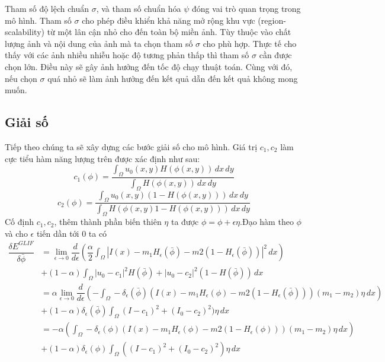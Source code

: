 \documentclass[14pt,oneside,a4paper]{extreport}
\begin{document}
Tham số độ lệch chuẩn $\sigma$, và tham số chuẩn hóa $\psi$ đóng vai trò quan trọng trong mô hình.  Tham số $\sigma$ cho phép điều khiển khả năng mở rộng khu vực (region-scalability) từ một lân cận nhỏ cho đến toàn bộ miền ảnh. Tùy thuộc vào chất lượng ảnh và nội dung của ảnh mà ta chọn tham số $\sigma$ cho phù hợp. Thực tế cho thấy với các ảnh nhiều nhiễu hoặc độ tương phản thấp thì tham số $\sigma$ cần được chọn lớn. Điều này sẽ gây  ảnh hưởng đến tốc độ chạy thuật toán. Cùng với đó, nếu chọn $\sigma$ quá nhỏ sẽ làm ảnh hưởng đến kết quả dẫn đến kết quả không mong muốn.
\subsection{Giải số}
Tiếp theo chúng ta sẽ xây dựng các bước giải số cho mô hình. Giá trị $c_1, c_2$ làm cực tiểu hàm năng lượng trên được xác định như sau:
\begin{equation*}
c_1(\phi)=\dfrac{\int_{\Omega}u_0(x,y)H(\phi(x,y))\,dx \,dy}{\int_{\Omega}H(\phi(x,y))\,dx\,dy}
\end{equation*}
\begin{equation*}
c_2(\phi)=\dfrac{\int_{\Omega}u_0(x,y)(1-H(\phi(x,y)))\,dx \,dy}{\int_{\Omega}H(\phi(x,y)1-H(\phi(x,y)))\,dx\,dy}
\end{equation*}
Cố định $c_1, c_2$, thêm thành phần biến thiên $\eta$ ta được $\phi=\phi+\epsilon\eta$.Đạo hàm theo $\phi$ và cho $\epsilon$ tiến dần tới 0 ta có
\begin{equation*}
\begin{split}
\dfrac{\delta E^{GLIF}}{\delta\bar{\phi} } &=\lim_{\epsilon \rightarrow 0}\dfrac{d}{d \epsilon}(\dfrac{\alpha}{2}\int_{\Omega}|I(x)-m_1H_{\epsilon}(\bar{\phi})-m2(1-H_{\epsilon}(\bar{\phi}))|^2\,dx) \\ 
&+(1-\alpha) \int_{\Omega} |u_0-c_1|^2H(\bar{\phi})+ |u_0-c_2|^2(1-H(\bar{\phi})) \,dx\\
&=\alpha\lim_{\epsilon \rightarrow 0}\dfrac{d}{d \epsilon}(-\int_{\Omega}-\delta_{\epsilon}(\bar{\phi})(I(x)-m_1H_{\epsilon}(\phi)-m2(1-H_{\epsilon}(\bar{\phi})))(m_1-m_2)\eta\,dx) \\ 
&+(1-\alpha)\delta_{\epsilon}(\bar{\phi})\int_{\Omega} (I-c_1)^2+ (I_0-c_2)^2)\eta \,dx\\
&=-\alpha(\int_{\Omega}-\delta_{\epsilon}(\phi)(I(x)-m_1 H_{\epsilon}(\phi)-m2(1-H_{\epsilon}(\phi)))(m_1-m_2)\eta\,dx)\\
&+(1-\alpha)\delta_{\epsilon}(\phi)\int_{\Omega} ((I-c_1)^2+ (I_0-c_2)^2)\eta \,dx
\end{split}
\end{equation*}
\end{document}
